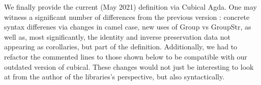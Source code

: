 We finally provide the current (May 2021) definition via Cubical Agda. One may
witness a significant number of differences from the previous version :
concrete syntax differenes via changes in camel case, new uses of Group vs
GroupStr, as well as, most significantly, the identity and inverse preservation
data not appearing as corollaries, but part of the definition. Additionally, we
had to refactor the commented lines to those shown below to be compatible with
our outdated version of cubical.  These changes would not just be interesting
to look at from the author of the libraries's perspective, but also
syntactically.
\begin{code}%
%
\>[2]\AgdaSpace{}%
\AgdaSpace{}%
\AgdaSymbol{\{}\AgdaSpace{}%
\AgdaSymbol{:}\AgdaSpace{}%
\AgdaSpace{}%
\AgdaSymbol{\}}\AgdaSpace{}%
\AgdaSymbol{\{}\AgdaSpace{}%
\AgdaSymbol{:}\AgdaSpace{}%
\AgdaSpace{}%
\AgdaSymbol{\}}\<%
\\
\>[2][@{}l@{\AgdaIndent{0}}]%
\>[4]\AgdaSymbol{(}\AgdaSpace{}%
\AgdaSymbol{:}\AgdaSpace{}%
\AgdaSpace{}%
\AgdaSymbol{)}\AgdaSpace{}%
\AgdaSymbol{(}\AgdaSpace{}%
\AgdaSymbol{:}\AgdaSpace{}%
\AgdaSpace{}%
\AgdaSpace{}%
\AgdaSymbol{)}\AgdaSpace{}%
\AgdaSymbol{(}\AgdaSpace{}%
\AgdaSymbol{:}\AgdaSpace{}%
\AgdaSpace{}%
\AgdaSymbol{)}\<%
\\
%
\>[4]\AgdaSymbol{:}\AgdaSpace{}%
\AgdaSpace{}%
\AgdaSymbol{(}\AgdaSpace{}%
\AgdaSpace{}%
\AgdaSymbol{)}\<%
\\
%
\>[4]\<%
\\
%
\\[\AgdaEmptyExtraSkip]%
%
\>[4]\<%
\\
%
\>[4]\<%
\\
\>[4][@{}l@{\AgdaIndent{0}}]%
\>[6]\AgdaSpace{}%
\AgdaSpace{}%
\AgdaSymbol{=}\AgdaSpace{}%
\AgdaSpace{}%
\<%
\\
%
\>[6]\AgdaSpace{}%
\AgdaSpace{}%
\AgdaSymbol{=}\AgdaSpace{}%
\AgdaSpace{}%
\<%
\\
%
\\[\AgdaEmptyExtraSkip]%

\end{code}
